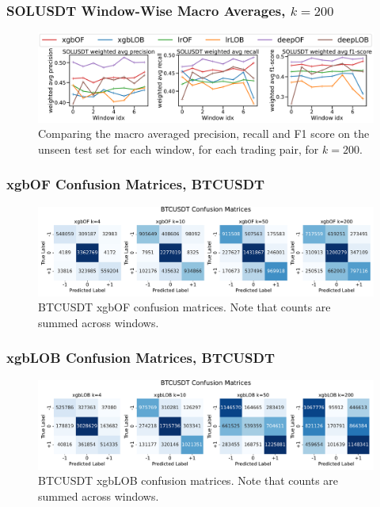 \documentclass[handout]{beamer}
\begin{document}
\begin{frame}
    \frametitle{SOLUSDT Window-Wise Macro Averages, $k=200$}
    \begin{figure}[htpb!]
        \centering
        \includegraphics[width=1.0\textwidth]{./images/SOLUSDT_macro_results_k=200.pdf}
        \caption{Comparing the macro averaged precision, recall and F1 score on the unseen test set for each window, for each trading pair, for $k=200$.}
        
    \end{figure}
\end{frame}

\begin{frame}
    \frametitle{xgbOF Confusion Matrices, BTCUSDT}
    \begin{figure}[htpb!]
        \centering
        \includegraphics[width=1.0\textwidth]{./images/BTCUSDT_xgbOF_confusion_matrices.pdf}
        \caption{BTCUSDT xgbOF confusion matrices. Note that counts are summed across windows.}
    \end{figure}
\end{frame}

\begin{frame}
    \frametitle{xgbLOB Confusion Matrices, BTCUSDT}
    \begin{figure}[htpb!]
        \centering
        \includegraphics[width=1.0\textwidth]{./images/BTCUSDT_xgbLOB_confusion_matrices.pdf}
        \caption{BTCUSDT xgbLOB confusion matrices. Note that counts are summed across windows.}
    \end{figure}
\end{frame}
\end{document}
